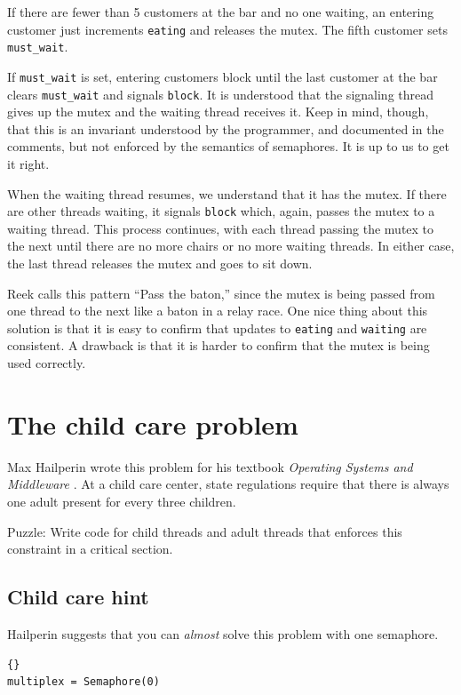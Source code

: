 \documentclass{book}
\newcommand{\clearemptydoublepage}{\newpage\cleardoublepage}
\begin{document}
If there are fewer than 5 customers at the bar and no one waiting, an
entering customer just increments {\tt eating} and releases the
mutex.  The fifth customer sets {\tt must\_wait}.

If {\tt must\_wait} is set, entering customers block until the last
customer at the bar clears {\tt must\_wait} and signals {\tt block}.
It is understood that the signaling thread gives up the mutex and the
waiting thread receives it.  Keep in mind, though, that this is an
invariant understood by the programmer, and documented in the
comments, but not enforced by the semantics of semaphores.  It is up
to us to get it right.

When the waiting thread resumes, we understand that it has
the mutex.  If there are other threads waiting,
it signals {\tt block} which, again,
passes the mutex to a waiting thread.  This process
continues, with each thread passing the mutex to the next until
there are no more chairs or no more waiting threads.  In either
case, the last thread releases the mutex and goes to sit down.

Reek calls this pattern ``Pass the baton,'' since the mutex
is being passed from one thread to the next like a baton in a
relay race.
One nice thing about this solution is that it is easy to confirm
that updates to {\tt eating} and {\tt waiting} are consistent.
A drawback is that it is harder to confirm that the mutex is
being used correctly.


\section{The child care problem}

Max Hailperin wrote this problem for his textbook {\em Operating
Systems and Middleware} \cite{hailperin}.  At a child care center,
state regulations require that there is always one adult present for
every three children.

Puzzle: Write code for child threads and adult threads that enforces
this constraint in a critical section.


\clearemptydoublepage
\subsection {Child care hint}

Hailperin suggests that you can {\em almost} solve this problem
with one semaphore.

\begin{lstlisting}[title={Child care hint}]{}
multiplex = Semaphore(0)
\end{lstlisting}
\end{document}

